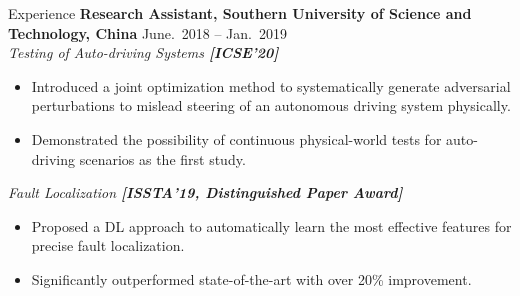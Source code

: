 \begin{rSection}{Experience}
{\bf Research Assistant, Southern University of Science and Technology, China}  \hfill { June.~2018 -- Jan.~2019} \\ 
\textit{Testing of Auto-driving Systems \textbf{[{ICSE'20}]}}
\begin{itemize}[noitemsep,topsep=-5pt]
    \item Introduced a joint optimization method to systematically generate adversarial perturbations to mislead steering of an autonomous driving system physically.
    \item Demonstrated the possibility of continuous physical-world tests for auto-driving scenarios as the first study.
\end{itemize}

\textit{Fault Localization \textbf{[{ISSTA'19, Distinguished Paper Award}]}}
\begin{itemize}[noitemsep,topsep=-5pt]
    \item Proposed a DL approach to automatically learn the most effective features for precise fault localization. 
    \item Significantly outperformed state-of-the-art with over 20\% improvement.
\end{itemize}
\end{rSection}

